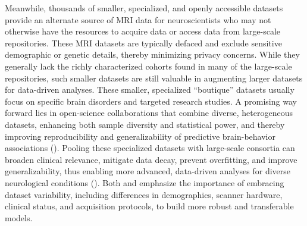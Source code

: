 Meanwhile, thousands of smaller, specialized, and openly accessible datasets 
provide an alternate source of MRI data for neuroscientists 
who may not otherwise have the resources to acquire data or access data from large-scale repositories. 
These MRI datasets are typically defaced and exclude sensitive demographic or genetic details, 
thereby minimizing privacy concerns.
While they generally lack the richly characterized cohorts found in many of the large-scale repositories, 
such smaller datasets are still valuable in augmenting larger datasets for data-driven analyses. 
These smaller, specialized ``boutique'' datasets usually focus on specific brain disorders and targeted research studies. 
A promising way forward lies in open-science collaborations that combine diverse, 
heterogeneous datasets, enhancing both sample diversity and statistical power, 
and thereby improving reproducibility and generalizability 
of predictive brain-behavior associations (\cite{marek2024replicability, adkinson2024brain, yang2024limits}).
Pooling these specialized datasets with large-scale consortia can broaden clinical relevance, 
mitigate data decay, prevent overfitting, and improve generalizability, 
thus enabling more advanced, data-driven analyses for diverse neurological conditions
(\cite{horien2021hitchhiker, marek2024replicability, adkinson2024brain, yang2024limits}).
Both \cite{kiar2024experimental} and \cite{adkinson2024brain} emphasize the importance 
of embracing dataset variability, including differences in demographics, 
scanner hardware, clinical status, and acquisition protocols, to build more 
robust and transferable models. 


